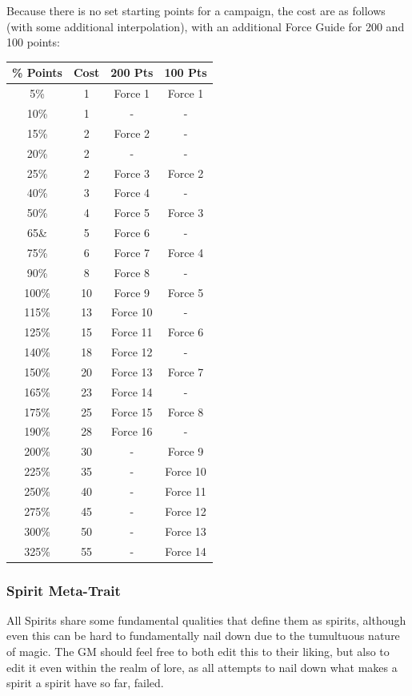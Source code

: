 \begin{multicols*}{3}
	Because there is no set starting points for a campaign, the cost are as follows (with some additional interpolation), with an additional Force Guide for 200 and 100 points:
	\begin{center} \label{spirit_ally_cost}
		\begin{tabular}{|c|c|c|c|}
			\hline
			\% Points & Cost & 200 Pts & 100 Pts\\
			\hline
			\hline
			5\% & 1 & Force 1 & Force 1 \\
			10\% & 1 & - & - \\
			15\% & 2 & Force 2 & - \\
			20\% & 2 & - & - \\
			25\% & 2 & Force 3 & Force 2 \\
			40\% & 3 & Force 4 & - \\
			50\% & 4 & Force 5 & Force 3 \\
			65\& & 5 & Force 6 & - \\
			75\% & 6 & Force 7 & Force 4 \\
			90\% & 8 & Force 8 & - \\
			100\% & 10 & Force 9 & Force 5 \\
			115\% & 13 & Force 10 & - \\
			125\% & 15 & Force 11 & Force 6 \\
			140\% & 18 & Force 12 & - \\
			150\% & 20 & Force 13 & Force 7 \\
			165\% & 23 & Force 14 & - \\
			175\% & 25 & Force 15 & Force 8 \\
			190\% & 28 & Force 16 & - \\
			200\% & 30 & - & Force 9 \\
			225\% & 35 & - & Force 10 \\
			250\% & 40 & - & Force 11 \\
			275\% & 45 & - & Force 12 \\
			300\% & 50 & - & Force 13 \\
			325\% & 55 & - & Force 14 \\
			\hline
		\end{tabular}
	\end{center}
	
	\subsubsection{Spirit Meta-Trait}\label{spirit_meta_trait}
	
	All Spirits share some fundamental qualities that define them as spirits, although even this can be hard to fundamentally nail down due to the tumultuous nature of magic. The GM should feel free to both edit this to their liking, but also to edit it even within the realm of lore, as all attempts to nail down what makes a spirit a spirit have so far, failed.   
	

\end{multicols*}
